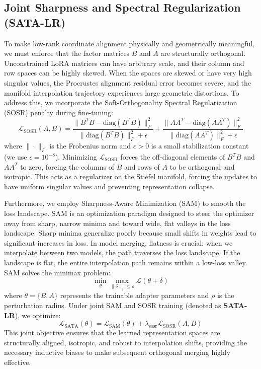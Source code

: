 \documentclass{article}
\theoremstyle{plain}
\theoremstyle{definition}
\theoremstyle{remark}
\begin{document}
\subsection{Joint Sharpness and Spectral Regularization (SATA-LR)}
To make low-rank coordinate alignment physically and geometrically meaningful, we must enforce that the factor matrices $B$ and $A$ are structurally orthogonal. Unconstrained LoRA matrices can have arbitrary scale, and their column and row spaces can be highly skewed. When the spaces are skewed or have very high singular values, the Procrustes alignment residual error becomes severe, and the manifold interpolation trajectory experiences large geometric distortions. To address this, we incorporate the Soft-Orthogonality Spectral Regularization (SOSR) penalty during fine-tuning:
\begin{equation}
\label{eq:sosr}
\mathcal{L}_{\text{SOSR}}(A, B) = \frac{\|B^T B - \text{diag}(B^T B)\|_F^2}{\|\text{diag}(B^T B)\|_F^2 + \epsilon} + \frac{\|A A^T - \text{diag}(A A^T)\|_F^2}{\|\text{diag}(A A^T)\|_F^2 + \epsilon}
\end{equation}
where $\|\cdot\|_F$ is the Frobenius norm and $\epsilon > 0$ is a small stabilization constant (we use $\epsilon = 10^{-8}$). Minimizing $\mathcal{L}_{\text{SOSR}}$ forces the off-diagonal elements of $B^T B$ and $A A^T$ to zero, forcing the columns of $B$ and rows of $A$ to be orthogonal and isotropic. This acts as a regularizer on the Stiefel manifold, forcing the updates to have uniform singular values and preventing representation collapse.

Furthermore, we employ Sharpness-Aware Minimization (SAM) \cite{foret2020sharpness} to smooth the loss landscape. SAM is an optimization paradigm designed to steer the optimizer away from sharp, narrow minima and toward wide, flat valleys in the loss landscape. Sharp minima generalize poorly because small shifts in weights lead to significant increases in loss. In model merging, flatness is crucial: when we interpolate between two models, the path traverses the loss landscape. If the landscape is flat, the entire interpolation path remains within a low-loss valley. SAM solves the minimax problem:
\begin{equation}
\min_{\theta} \max_{\|\delta\|_2 \leq \rho} \mathcal{L}(\theta + \delta)
\end{equation}
where $\theta = \{B, A\}$ represents the trainable adapter parameters and $\rho$ is the perturbation radius. Under joint SAM and SOSR training (denoted as \textbf{SATA-LR}), we optimize:
\begin{equation}
\label{eq:sata}
\mathcal{L}_{\text{SATA}}(\theta) = \mathcal{L}_{\text{SAM}}(\theta) + \lambda_{\text{sosr}} \mathcal{L}_{\text{SOSR}}(A, B)
\end{equation}
This joint objective ensures that the learned representation spaces are structurally aligned, isotropic, and robust to interpolation shifts, providing the necessary inductive biases to make subsequent orthogonal merging highly effective.
\end{document}
